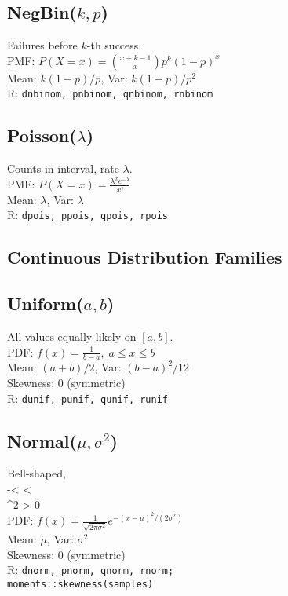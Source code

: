\documentclass[7pt,landscape]{article}
\begin{document}
\begin{multicols}{3}
\subsection*{NegBin($k,p$)}
Failures before $k$-th success. \\
PMF: $P(X=x)=\binom{x+k-1}{x}p^k(1-p)^x$ \\
Mean: $k(1-p)/p$, Var: $k(1-p)/p^2$ \\
R: \texttt{dnbinom, pnbinom, qnbinom, rnbinom}

\subsection*{Poisson($\lambda$)}
Counts in interval, rate $\lambda$. \\
PMF: $P(X=x)=\tfrac{\lambda^x e^{-\lambda}}{x!}$ \\
Mean: $\lambda$, Var: $\lambda$ \\
R: \texttt{dpois, ppois, qpois, rpois}

\subsection*{Continuous Distribution Families}

\subsection*{Uniform($a,b$)}
All values equally likely on $[a,b]$. \\
PDF: $f(x)=\tfrac{1}{b-a}, \; a \le x \le b$ \\
Mean: $(a+b)/2$, Var: $(b-a)^2/12$ \\
Skewness: 0 (symmetric) \\
R: \texttt{dunif, punif, qunif, runif}

\subsection*{Normal($\mu,\sigma^2$)}
Bell-shaped, \\ 
-\infty < \mu < \infty \\
\sigma^2 > 0 \\
PDF: $f(x)=\tfrac{1}{\sqrt{2\pi\sigma^2}} e^{-(x-\mu)^2/(2\sigma^2)}$ \\
Mean: $\mu$, Var: $\sigma^2$ \\
Skewness: 0 (symmetric) \\
R: \texttt{dnorm, pnorm, qnorm, rnorm; \\
moments::skewness(samples)}


\end{multicols}
\end{document}
